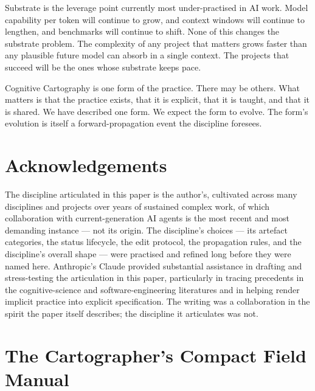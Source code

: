 \documentclass[11pt,a4paper,twocolumn]{article}
\begin{document}
Substrate is the leverage point currently most under-practised in
AI work. Model capability per token will continue to grow, and
context windows will continue to lengthen, and benchmarks will
continue to shift. None of this changes the substrate problem. The
complexity of any project that matters grows faster than any
plausible future model can absorb in a single context. The
projects that succeed will be the ones whose substrate keeps pace.

Cognitive Cartography is one form of the practice. There may be
others. What matters is that the practice exists, that it is
explicit, that it is taught, and that it is shared. We have
described one form. We expect the form to evolve. The form's
evolution is itself a forward-propagation event the discipline
foresees.

\section*{Acknowledgements}

The discipline articulated in this paper is the author's, cultivated
across many disciplines and projects over years of sustained complex
work, of which collaboration with current-generation AI agents is
the most recent and most demanding instance --- not its origin. The
discipline's choices --- its artefact categories, the status
lifecycle, the edit protocol, the propagation rules, and the
discipline's overall shape --- were practised and refined long
before they were named here. Anthropic's Claude provided substantial
assistance in drafting and stress-testing the articulation in this
paper, particularly in tracing precedents in the cognitive-science
and software-engineering literatures and in helping render implicit
practice into explicit specification. The writing was a
collaboration in the spirit the paper itself describes; the
discipline it articulates was not.




\appendix

\section{The Cartographer's Compact Field Manual}
\label{app:manual}
\end{document}
